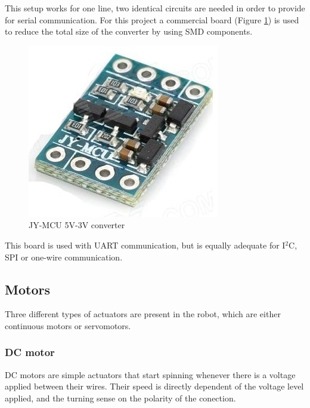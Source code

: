 			This setup works for one line, two identical circuits are needed in order to provide for serial communication. For this project a commercial board (Figure \ref{level-converter}) is used to reduce the total size of the converter by using SMD components.

			\begin{figure}[H]
					\centering
					\includegraphics[scale=0.4]{images/ProjectComponents/logic-voltage.jpg}
					\caption{JY-MCU 5V-3V converter }
					\label{level-converter}
			\end{figure}
			\bigskip

		This board is used with UART communication, but is equally adequate for I$^2$C, SPI or one-wire communication.
 








\bigskip


\subsection{Motors}

Three different types of actuators are present in the robot, which are either continuous motors or servomotors.

	\subsubsection{DC motor}
	
	DC motors are simple actuators that start spinning whenever there is a voltage applied between their wires.  Their speed is directly dependent of the voltage level applied, and the turning sense on the polarity of the conection.\\

